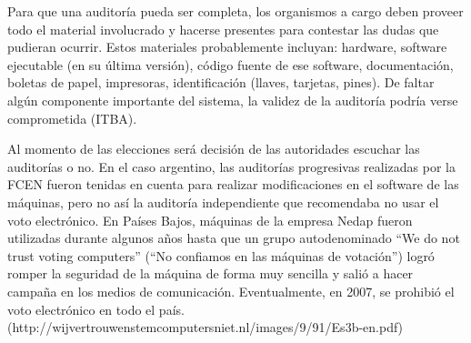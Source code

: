 Para que una auditoría pueda ser completa, los organismos a cargo deben proveer todo el material involucrado y hacerse presentes para contestar las dudas que pudieran ocurrir. Estos materiales probablemente incluyan: hardware, software ejecutable (en su última versión), código fuente de ese software, documentación, boletas de papel, impresoras, identificación (llaves, tarjetas, pines). De faltar algún componente importante del sistema, la validez de la auditoría podría verse comprometida (ITBA).

Al momento de las elecciones será decisión de las autoridades escuchar las auditorías o no. En el caso argentino, las auditorías progresivas realizadas por la FCEN fueron tenidas en cuenta para realizar modificaciones en el software de las máquinas, pero no así la auditoría independiente que recomendaba no usar el voto electrónico. En Países Bajos, máquinas de la empresa Nedap fueron utilizadas durante algunos años hasta que un grupo autodenominado “We do not trust voting computers” (“No confiamos en las máquinas de votación”) logró romper la seguridad de la máquina de forma muy sencilla y salió a hacer campaña en los medios de comunicación. Eventualmente, en 2007, se prohibió el voto electrónico en todo el país. (http://wijvertrouwenstemcomputersniet.nl/images/9/91/Es3b-en.pdf)
